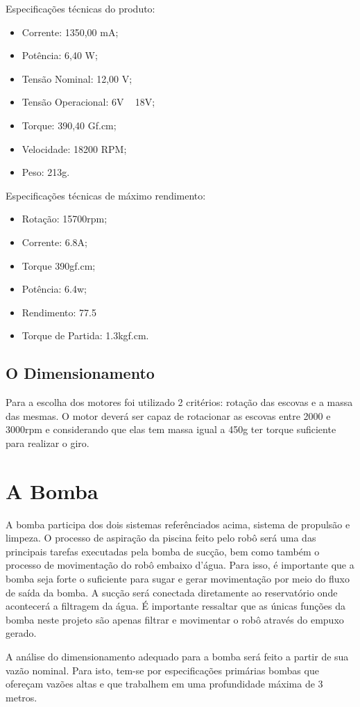 Especificações técnicas do produto:
\begin{itemize}
\item Corrente: 1350,00 mA;
\item Potência: 6,40 W;
\item Tensão Nominal: 12,00 V;
\item Tensão Operacional: 6V ~ 18V;
\item Torque: 390,40 Gf.cm;
\item Velocidade: 18200 RPM;
\item Peso: 213g.
\end{itemize}

Especificações técnicas de máximo rendimento:
\begin{itemize}
\item Rotação: 15700rpm;
\item Corrente: 6.8A;
\item Torque 390gf.cm;
\item Potência: 6.4w;
\item Rendimento: 77.5%
\item Torque de Partida: 1.3kgf.cm.
\end{itemize}

\subsection{O Dimensionamento}
Para a escolha dos motores foi utilizado 2 critérios: rotação das escovas e a massa das mesmas. O motor deverá ser capaz de rotacionar as escovas entre 2000 e 3000rpm e considerando que elas tem massa igual a 450g ter torque suficiente para realizar o giro.

\section{A Bomba}
A bomba participa dos dois sistemas referênciados acima, sistema de propulsão e limpeza. O processo de aspiração da piscina feito pelo robô será uma das principais tarefas executadas pela bomba de sucção, bem como também o processo de movimentação do robô embaixo d’água. Para isso, é importante que a bomba seja  forte o suficiente para sugar e gerar movimentação por meio do fluxo de saída da bomba. A sucção será conectada diretamente ao reservatório onde acontecerá a filtragem da água. É importante ressaltar que as únicas funções da bomba neste projeto são apenas filtrar e movimentar o robô através do empuxo gerado.

A análise do dimensionamento adequado para a bomba será feito a partir de sua vazão nominal. Para isto, tem-se por especificações primárias bombas que ofereçam vazões altas e que trabalhem em uma profundidade máxima de 3 metros.

